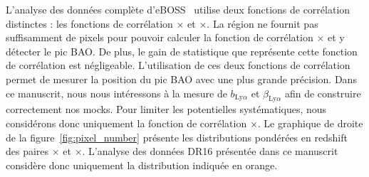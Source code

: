 L'analyse \lya{} des données complète d'eBOSS~\autocite{DuMasdesBourboux2020} utilise deux fonctions de corrélation distinctes : les fonctions de corrélation \lyalya{}$\times$\lyalya{} et \lyalya{}$\times$\lyalyb{}.
La région \lyb{} ne fournit pas suffisamment de pixels pour pouvoir calculer la fonction de corrélation \lyalyb{}$\times$\lyalyb{} et y détecter le pic BAO. De plus, le gain de statistique que représente cette fonction de corrélation est négligeable.
L'utilisation de ces deux fonctions de corrélation permet de mesurer la position du pic BAO avec une plus grande précision. Dans ce manuscrit, nous nous intéressons à la mesure de $b_{\mathrm{Ly}\alpha}$ et $\beta_{\mathrm{Ly}\alpha}$ afin de construire correctement nos mocks. Pour limiter les potentielles systématiques, nous considérons donc uniquement la fonction de corrélation \lyalya{}$\times$\lyalya{}.
Le graphique de droite de la figure~\ref{fig:pixel_number} présente les distributions pondérées en redshift des paires \lyalya{}$\times$\lyalya{} et \lyalya{}$\times$\lyalyb{}. L'analyse des données DR16 présentée dans ce manuscrit considère donc uniquement la distribution indiquée en orange.


